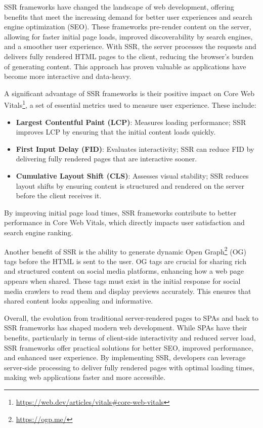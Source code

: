 SSR frameworks have changed the landscape of web development, offering benefits that meet the increasing demand for better user experiences and search engine optimization (SEO). These frameworks pre-render content on the server, allowing for faster initial page loads, improved discoverability by search engines, and a smoother user experience. With SSR, the server processes the requests and delivers fully rendered HTML pages to the client, reducing the browser’s burden of generating content. This approach has proven valuable as applications have become more interactive and data-heavy.

A significant advantage of SSR frameworks is their positive impact on Core Web Vitals\footnote{\url{https://web.dev/articles/vitals\#core-web-vitals}}, a set of essential metrics used to measure user experience. These include:

\begin{itemize}
	\item \textbf{Largest Contentful Paint (LCP)}: Measures loading performance; SSR improves LCP by ensuring that the initial content loads quickly.
	\item \textbf{First Input Delay (FID)}: Evaluates interactivity; SSR can reduce FID by delivering fully rendered pages that are interactive sooner.
	\item \textbf{Cumulative Layout Shift (CLS)}: Assesses visual stability; SSR reduces layout shifts by ensuring content is structured and rendered on the server before the client receives it.
\end{itemize}

By improving initial page load times, SSR frameworks contribute to better performance in Core Web Vitals, which directly impacts user satisfaction and search engine ranking.

Another benefit of SSR is the ability to generate dynamic Open Graph\footnote{\url{https://ogp.me/}} (OG) tags before the HTML is sent to the user. OG tags are crucial for sharing rich and structured content on social media platforms, enhancing how a web page appears when shared. These tags must exist in the initial response for social media crawlers to read them and display previews accurately. This ensures that shared content looks appealing and informative.

Overall, the evolution from traditional server-rendered pages to SPAs and back to SSR frameworks has shaped modern web development. While SPAs have their benefits, particularly in terms of client-side interactivity and reduced server load, SSR frameworks offer practical solutions for better SEO, improved performance, and enhanced user experience. By implementing SSR, developers can leverage server-side processing to deliver fully rendered pages with optimal loading times, making web applications faster and more accessible.

